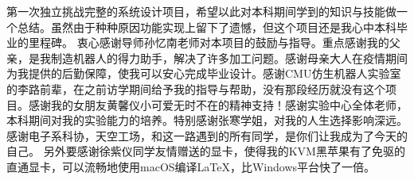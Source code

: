 
\begin{acknowledgements}
  第一次独立挑战完整的系统设计项目，希望以此对本科期间学到的知识与技能做一个总结。虽然由于种种原因功能实现上留下了遗憾，但这个项目还是我心中本科毕业的里程碑。
  衷心感谢导师孙忆南老师对本项目的鼓励与指导。重点感谢我的父亲，是我制造机器人的得力助手，解决了许多加工问题。感谢母亲大人在疫情期间为我提供的后勤保障，使我可以安心完成毕业设计。感谢CMU仿生机器人实验室的李路前辈，在之前访学期间给予我的指导与帮助，没有那段经历就没有这个项目。感谢我的女朋友黄馨仪小可爱无时不在的精神支持！感谢实验中心全体老师，本科期间对我的实验能力的培养。特别感谢张寒学姐，对我的人生选择影响深远。感谢电子系科协，天空工场，和这一路遇到的所有同学，是你们让我成为了今天的自己。
  另外要感谢徐紫仪同学友情赠送的显卡，使得我的KVM黑苹果有了免驱的直通显卡，可以流畅地使用macOS编译\LaTeX{}，比Windows平台快了一倍。
\end{acknowledgements}
